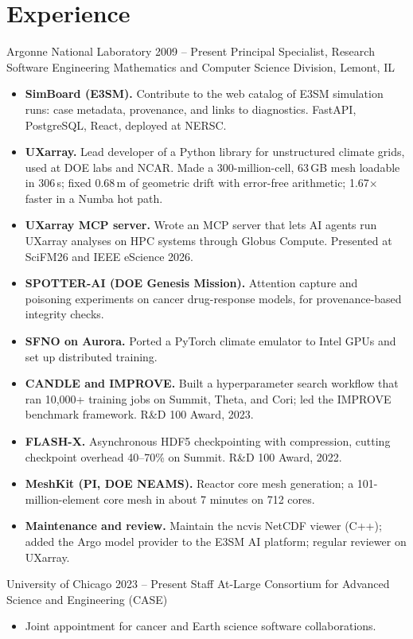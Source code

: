 \documentclass[10pt,letterpaper]{article}
\begin{document}
\section{Experience}
\entryheader
  {Argonne National Laboratory}
  {2009 -- Present}
  {Principal Specialist, Research Software Engineering}
  {Mathematics and Computer Science Division, Lemont, IL}
\begin{itemize}
  \item \textbf{SimBoard (E3SM).} Contribute to the web catalog of E3SM simulation runs: case metadata, provenance, and links to diagnostics. FastAPI, PostgreSQL, React, deployed at NERSC.
  \item \textbf{UXarray.} Lead developer of a Python library for unstructured climate grids, used at DOE labs and NCAR. Made a 300-million-cell, 63\,GB mesh loadable in 306\,s; fixed 0.68\,m of geometric drift with error-free arithmetic; 1.67$\times$ faster in a Numba hot path.
  \item \textbf{UXarray MCP server.} Wrote an MCP server that lets AI agents run UXarray analyses on HPC systems through Globus Compute. Presented at SciFM26 and IEEE eScience 2026.
  \item \textbf{SPOTTER-AI (DOE Genesis Mission).} Attention capture and poisoning experiments on cancer drug-response models, for provenance-based integrity checks.
  \item \textbf{SFNO on Aurora.} Ported a PyTorch climate emulator to Intel GPUs and set up distributed training.
  \item \textbf{CANDLE and IMPROVE.} Built a hyperparameter search workflow that ran 10,000+ training jobs on Summit, Theta, and Cori; led the IMPROVE benchmark framework. R\&D 100 Award, 2023.
  \item \textbf{FLASH-X.} Asynchronous HDF5 checkpointing with compression, cutting checkpoint overhead 40--70\% on Summit. R\&D 100 Award, 2022.
  \item \textbf{MeshKit (PI, DOE NEAMS).} Reactor core mesh generation; a 101-million-element core mesh in about 7 minutes on 712 cores.
  \item \textbf{Maintenance and review.} Maintain the ncvis NetCDF viewer (C++); added the Argo model provider to the E3SM AI platform; regular reviewer on UXarray.
\end{itemize}

\entryheader
  {University of Chicago}
  {2023 -- Present}
  {Staff At-Large}
  {Consortium for Advanced Science and Engineering (CASE)}
\begin{itemize}
  \item Joint appointment for cancer and Earth science software collaborations.
\end{itemize}
\end{document}
